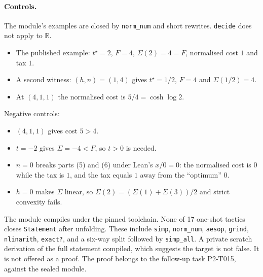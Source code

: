 \documentclass[11pt]{article}
\theoremstyle{definition}
\theoremstyle{remark}
\begin{document}
\paragraph{Controls.} The module's examples are closed by \texttt{norm\_num} and short rewrites.
\texttt{decide} does not apply to $\mathbb{R}$.
\begin{itemize}
\item The published example: $t^\star=2$, $F=4$, $\Sigma(2)=4=F$, normalised cost $1$ and tax $1$.
\item A second witness: $(h,n)=(1,4)$ gives $t^\star=1/2$, $F=4$ and $\Sigma(1/2)=4$.
\item At $(4,1,1)$ the normalised cost is $5/4=\cosh\log 2$.
\end{itemize}
Negative controls:
\begin{itemize}
\item $(4,1,1)$ gives cost $5>4$.
\item $t=-2$ gives $\Sigma=-4<F$, so $t>0$ is needed.
\item $n=0$ breaks parts (5) and (6) under Lean's $x/0=0$: the normalised cost is $0$ while the tax is $1$, and the tax equals $1$ away from the ``optimum'' $0$.
\item $h=0$ makes $\Sigma$ linear, so $\Sigma(2)=(\Sigma(1)+\Sigma(3))/2$ and strict convexity fails.
\end{itemize}
The module compiles under the pinned toolchain. None of 17 one-shot tactics closes \texttt{Statement} after unfolding.
These include \texttt{simp}, \texttt{norm\_num}, \texttt{aesop}, \texttt{grind}, \texttt{nlinarith}, \texttt{exact?}, and a six-way split followed by \texttt{simp\_all}.
A private scratch derivation of the full statement compiled, which suggests the target is not false.
It is not offered as a proof. The proof belongs to the follow-up task P2-T015, against the sealed module.
\end{document}
